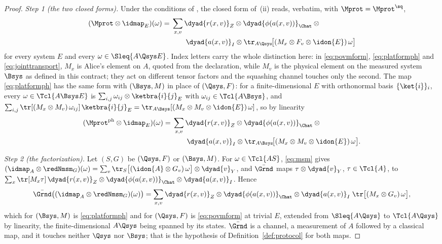 \begin{proof}
\emph{Step 1 (the two closed forms).} Under the conditions of
, the closed form of \,(ii)
reads, verbatim, with $\Mprot=\Mprot^{\sq}$,
\begin{equation}\label{eq:povmform}
\begin{split}
  (\Mprot\otimes\idmap_E)(\omega)
  ={}&\sum_{x,v}
  \dyad{r(x,v)}_{Z}\otimes\dyad{\phi(a(x,v))}_{\Chat}\otimes{}\\
  &\qquad\dyad{a(x,v)}_{I}\otimes
  \tr_{A\Qsys}\!\big[(M_x\otimes F_v\otimes\idon{E})\,\omega\big]
\end{split}
\end{equation}
for every system $E$ and every $\omega\in\Sleq{A\Qsys E}$. Index letters
carry the whole distinction here: in \eqref{eq:povmform},
\eqref{eq:platformph} and \eqref{eq:jointtransport}, $M_x$ is Alice's element
on $A$, quoted from the declaration, while $M_v$ is the physical element on
the measured system $\Bsys$ as defined in this contract; they act on
different tensor factors and the squashing channel touches only the second.
The map \eqref{eq:platformph} has the same form with $(\Bsys,M)$ in place of
$(\Qsys,F)$: for a finite-dimensional $E$ with orthonormal basis
$\{\ket{i}\}_i$, every $\omega\in\Tcl{A\Bsys E}$ is
$\sum_{i,j}\omega_{ij}\otimes\ketbra{i}{j}_E$ with $\omega_{ij}\in\Tcl{A\Bsys}$,
and $\sum_{i,j}\tr[(M_x\otimes M_v)\,\omega_{ij}]\,\ketbra{i}{j}_E
=\tr_{A\Bsys}[(M_x\otimes M_v\otimes\idon{E})\,\omega]$, so by linearity
\begin{equation}\label{eq:povmformph}
\begin{split}
  (\Mprot^{\mathrm{ph}}\otimes\idmap_E)(\omega)
  ={}&\sum_{x,v}
  \dyad{r(x,v)}_{Z}\otimes\dyad{\phi(a(x,v))}_{\Chat}\otimes{}\\
  &\qquad\dyad{a(x,v)}_{I}\otimes
  \tr_{A\Bsys}\!\big[(M_x\otimes M_v\otimes\idon{E})\,\omega\big].
\end{split}
\end{equation}

\emph{Step 2 (the factorization).} Let $(S,G)$ be $(\Qsys,F)$ or
$(\Bsys,M)$. For $\omega\in\Tcl{AS}$, \eqref{eq:msm} gives
$(\idmap_A\otimes\redNmsm_G)(\omega)
=\sum_v\tr_S\big[(\idon{A}\otimes G_v)\,\omega\big]\otimes\dyad{v}_Y$, and
$\bar{\Grnd}$ maps $\tau\otimes\dyad{v}_Y$, $\tau\in\Tcl{A}$, to
$\sum_x\tr[M_x\tau]\,\dyad{r(x,v)}_{Z}\otimes\dyad{\phi(a(x,v))}_{\Chat}
\otimes\dyad{a(x,v)}_{I}$. Hence
\begin{equation*}
  \bar{\Grnd}\big((\idmap_A\otimes\redNmsm_G)(\omega)\big)
  =\sum_{x,v}\dyad{r(x,v)}_{Z}\otimes\dyad{\phi(a(x,v))}_{\Chat}\otimes
  \dyad{a(x,v)}_{I}\;\tr\big[(M_x\otimes G_v)\,\omega\big],
\end{equation*}
which for $(\Bsys,M)$ is \eqref{eq:platformph} and for $(\Qsys,F)$ is
\eqref{eq:povmform} at trivial $E$, extended from $\Sleq{A\Qsys}$ to
$\Tcl{A\Qsys}$ by linearity, the finite-dimensional $A\Qsys$ being spanned by
its states. $\bar{\Grnd}$ is a channel, a measurement of $A$ followed by a
classical map, and it touches neither $\Qsys$ nor $\Bsys$; that is the
hypothesis of Definition~\ref{def:protocol} for both maps.


\end{proof}
